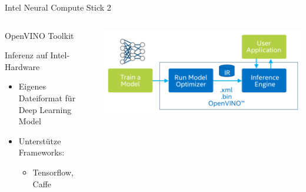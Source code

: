\begin{frame}{Intel Neural Compute Stick 2}
{\begin{columns}[T]
        \begin{block}{OpenVINO Toolkit}
    
            Inferenz auf Intel-Hardware
            \begin{itemize}
                \item Eigenes Dateiformat für Deep Learning Model
                \item Unterstütze Frameworks:
                \begin{itemize}
                    \item  Tensorflow, Caffe
                \end{itemize}
            \end{itemize}
        \end{block}
            \includegraphics[width=\textwidth]{Bilder/open_vino_workflow_steps.png}
        \end{columns}

    }
        
\end{frame}
